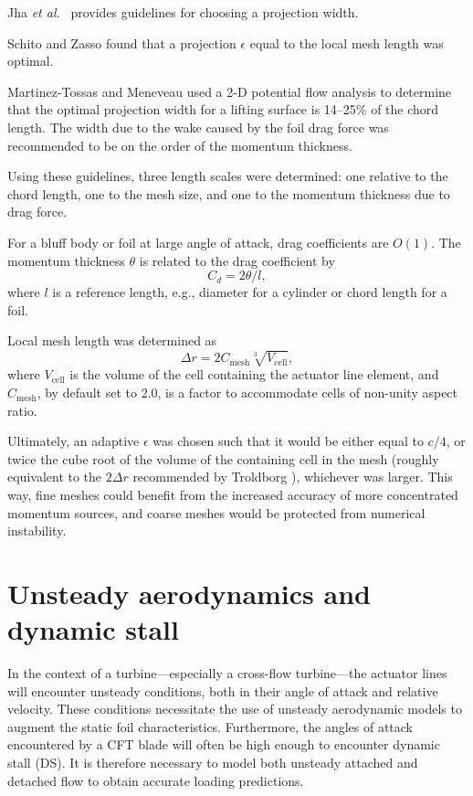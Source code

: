 Jha \emph{et al.}~\cite{Jha2014} provides guidelines for choosing a projection
width.

Schito and Zasso \cite{Schito2014} found that a projection $\epsilon$ equal to
the local mesh length was optimal.

Martinez-Tossas and Meneveau \cite{Martinez-Tossas2015b} used a 2-D potential
flow analysis to determine that the optimal projection width for a lifting
surface is 14--25\% of the chord length. The width due to the wake caused by the
foil drag force was recommended to be on the order of the momentum thickness.

Using these guidelines, three length scales were determined: one relative to the
chord length, one to the mesh size, and one to the momentum thickness due to
drag force.

For a bluff body or foil at large angle of attack, drag coefficients are $O(1)$.
The momentum thickness $\theta$ is related to the drag coefficient by
\cite{TennekesAndLumley}
\begin{equation}
    C_d = 2 \theta / l,
    \label{eq:mom-thickness}
\end{equation}
where $l$ is a reference length, e.g., diameter for a cylinder or chord length
for a foil.

Local mesh length was determined as 
\begin{equation}
    \Delta r = 2C_\mathrm{mesh} \sqrt[3]{V_\mathrm{cell}},
\end{equation}
where $V_\mathrm{cell}$ is the volume of the cell containing the actuator line
element, and $C_\mathrm{mesh}$, by default set to 2.0, is a factor to
accommodate cells of non-unity aspect ratio.

Ultimately, an adaptive $\epsilon$ was chosen such that it would be either equal
to $c/4$, or twice the cube root of the volume of the containing cell in the
mesh (roughly equivalent to the $2\Delta r$ recommended by Troldborg
\cite{Troldborg2008}), whichever was larger. This way, fine meshes could benefit
from the increased accuracy of more concentrated momentum sources, and coarse
meshes would be protected from numerical instability.



\section{Unsteady aerodynamics and dynamic stall}

In the context of a turbine---especially a cross-flow turbine---the actuator
lines will encounter unsteady conditions, both in their angle of attack and
relative velocity. These conditions necessitate the use of unsteady aerodynamic
models to augment the static foil characteristics. Furthermore, the angles of
attack encountered by a CFT blade will often be high enough to encounter dynamic
stall (DS). It is therefore necessary to model both unsteady attached and
detached flow to obtain accurate loading predictions.

